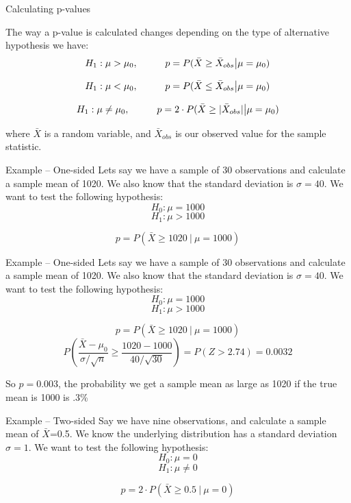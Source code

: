 \documentclass{beamer}
\begin{document}
\begin{frame}{Calculating p-values}
	
	The way a p-value is calculated changes depending on the type of alternative hypothesis we have:
	$$H_1: \mu> \mu_0, \text{\hspace{10mm}} p = P(\bar{X} \geq \bar{X}_{obs} \big\vert \mu=\mu_0)$$
	
	$$H_1: \mu< \mu_0, \text{\hspace{10mm}} p = P(\bar{X} \leq \bar{X}_{obs} \big\vert \mu=\mu_0)$$
	
	$$H_1: \mu \neq \mu_0, \text{\hspace{10mm}} p = 2 \cdot P(\bar{X} \geq \vert\bar{X}_{obs} \vert  \big\vert  \mu=\mu_0)$$

	where $\bar{X}$ is a random variable, and $\bar{X}_{obs}$ is our observed value for the sample statistic.
	
\end{frame}

\begin{frame}{Example -- One-sided}
	Lets say we have a sample of 30 observations and calculate a sample mean of 1020. We also know that the standard deviation is $\sigma=40$. We want to test the following hypothesis:
	$$H_0: \mu=1000$$
	$$H_1: \mu > 1000$$

	$$p = P(\bar{X} \geq 1020 \ \big| \ \mu=1000)$$
	
\end{frame}

\frame{}

\begin{frame}{Example -- One-sided}
	Lets say we have a sample of 30 observations and calculate a sample mean of 1020. We also know that the standard deviation is $\sigma=40$. We want to test the following hypothesis:
	$$H_0: \mu=1000$$
	$$H_1: \mu > 1000$$
	
	$$p=P(\bar{X} \geq  1020 \ \big| \  \mu=1000)$$
	$$P(\frac{\bar{X}-\mu_0}{\sigma/\sqrt{n}}\geq \frac{1020-1000}{40/\sqrt{30}} )= P(Z>2.74)=0.0032$$
	
	So $p=0.003$, the probability we get a sample mean as large as 1020 if the true mean is 1000 is .3\%
\end{frame}

\begin{frame}{Example -- Two-sided}
	Say we have nine observations, and calculate a sample mean of $\bar{X}$=0.5. We know the underlying distribution has a standard deviation $\sigma=1$. We want to test the following hypothesis:
	$$H_0: \mu=0$$
	$$H_1: \mu \neq 0$$

	$$p=2 \cdot P(\bar{X} \geq 0.5 \ \big| \ \mu=0)$$
	
\end{frame}
\end{document}
